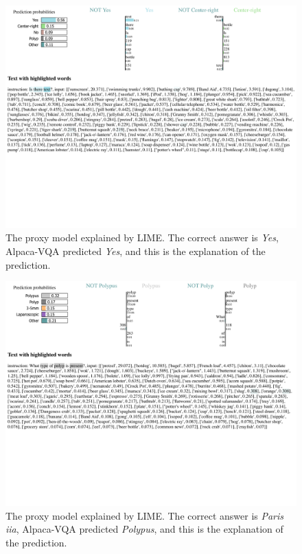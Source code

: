 \begin{figure}[htb]
    \centerline{
    \includegraphics[width=1.3\textwidth]{images/LIME_2.pdf}}
    \caption[The proxy model explained by LIME - 3.]{The proxy model explained by LIME. The correct answer is \textit{Yes}, Alpaca-VQA predicted \textit{Yes}, and this is the explanation of the prediction.}
    \label{fig:lime_appendix_lime_2}
\end{figure} 


\begin{figure}[htb]
    \centerline{
    \includegraphics[width=1.3\textwidth]{images/LIME_3.pdf}}
    \caption[The proxy model explained by LIME - 4.]{The proxy model explained by LIME. The correct answer is \textit{Paris iia}, Alpaca-VQA predicted \textit{Polypus}, and this is the explanation of the prediction.}
    \label{fig:lime_appendix_lime_3}
\end{figure} 

